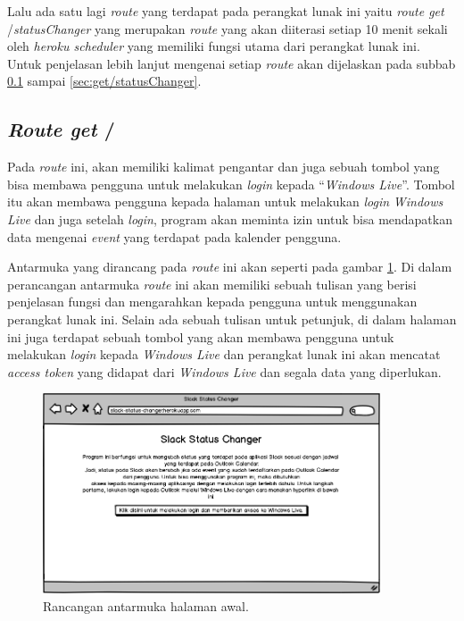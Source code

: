 Lalu ada satu lagi \textit{route} yang terdapat pada perangkat lunak ini yaitu \textit{route get} /\textit{statusChanger} yang merupakan \textit{route} yang akan diiterasi setiap 10 menit sekali oleh \textit{heroku scheduler} yang memiliki fungsi utama dari perangkat lunak ini. Untuk penjelasan lebih lanjut mengenai setiap \textit{route} akan dijelaskan pada subbab \ref{sec:get/} sampai \ref{sec:get/statusChanger}. 

\subsection{\textit{Route get} /}
\label{sec:get/}
Pada \textit{route} ini, akan memiliki kalimat pengantar dan juga sebuah tombol yang bisa membawa pengguna untuk melakukan \textit{login} kepada ``\textit{Windows Live}''. Tombol itu akan membawa pengguna kepada halaman untuk melakukan \textit{login} \textit{Windows Live} dan juga setelah \textit{login}, program akan meminta izin untuk bisa mendapatkan data mengenai \textit{event} yang terdapat pada kalender pengguna.

Antarmuka yang dirancang pada \textit{route} ini akan seperti pada gambar \ref{fig:mockup_halaman_awal}. Di dalam perancangan antarmuka \textit{route} ini akan memiliki sebuah tulisan yang berisi penjelasan fungsi dan mengarahkan kepada pengguna untuk menggunakan perangkat lunak ini. Selain ada sebuah tulisan untuk petunjuk, di dalam halaman ini juga terdapat sebuah tombol yang akan membawa pengguna untuk melakukan \textit{login} kepada \textit{Windows Live} dan perangkat lunak ini akan mencatat \textit{access token} yang didapat dari \textit{Windows Live} dan segala data yang diperlukan. 

\begin{figure}[h]
  \includegraphics[width=10cm]{./Gambar/MockUp/Step1.png}
  \centering
  \caption{Rancangan antarmuka halaman awal.}
  \label{fig:mockup_halaman_awal}
\end{figure}

